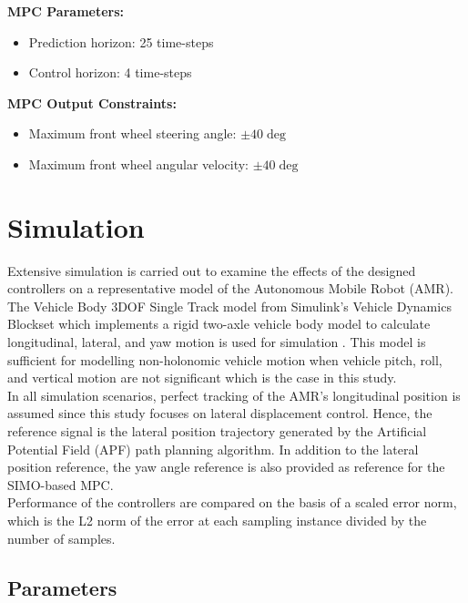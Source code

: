 \documentclass[a4paper, twocolumn]{article}
\begin{document}
\noindent
\textbf{MPC Parameters:}
\begin{itemize}[itemsep=2pt]
    \item Prediction horizon: 25 time-steps
    \item Control horizon: 4 time-steps
\end{itemize} 


\noindent
\textbf{MPC Output Constraints:}
\begin{itemize}[itemsep=2pt]
    \item Maximum front wheel steering angle: $\pm40\deg$
    \item Maximum front wheel angular velocity: $\pm40\deg$
\end{itemize}


\section{Simulation}
Extensive simulation is carried out to examine the effects of the designed controllers on a representative model of the Autonomous Mobile Robot (AMR). 
The Vehicle Body 3DOF Single Track model from Simulink's Vehicle Dynamics Blockset which implements a rigid two-axle vehicle body model to calculate longitudinal, 
lateral, and yaw motion is used for simulation \cite{mathworks2}. 
This model is sufficient for modelling non-holonomic vehicle motion when vehicle pitch, roll, and vertical motion are not significant which is the case in this study. \\

In all simulation scenarios, perfect tracking of the AMR's longitudinal position is assumed since this study focuses on lateral displacement control. 
Hence, the reference signal is the lateral position trajectory generated by the Artificial Potential Field (APF) path planning algorithm. 
In addition to the lateral position reference, the yaw angle reference is also provided as reference for the SIMO-based MPC. \\

Performance of the controllers are compared on the basis of a scaled error norm, which is the L2 norm of the error at each sampling instance divided by the number of samples. 

\subsection{Parameters}
\end{document}
